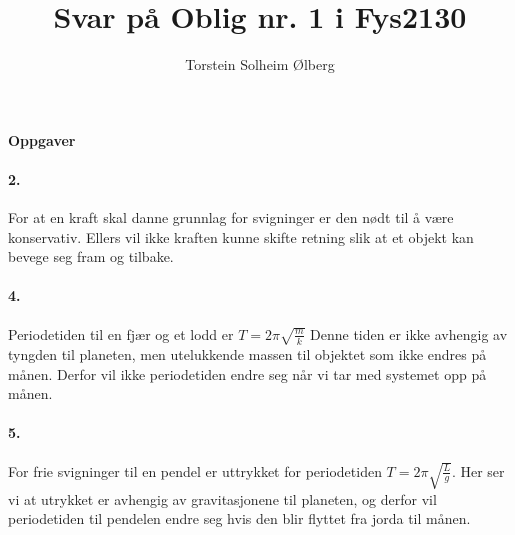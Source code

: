 \documentclass[11pt, A4paper,norsk]{article}
\author{Torstein Solheim Ølberg}
\title{Svar på Oblig nr. 1 i Fys2130}
\begin{document}
\maketitle
	\begin{center}
\Large \textbf{Oppgaver}
	\end{center}









		\paragraph{2.}
			\begin{flushleft}
For at en kraft skal danne grunnlag for svigninger er den nødt til å være konservativ. Ellers vil ikke kraften kunne skifte retning slik at et objekt kan bevege seg fram og tilbake.
			\end{flushleft}









		\paragraph{4.}
			\begin{flushleft}
Periodetiden til en fjær og et lodd er $T = 2 \pi \sqrt{\frac{m}{k}}$ Denne tiden er ikke avhengig av tyngden til planeten, men utelukkende massen til objektet som ikke endres på månen. Derfor vil ikke periodetiden endre seg når vi tar med systemet opp på månen.
			\end{flushleft}









		\paragraph{5.}
			\begin{flushleft}
For frie svigninger til en pendel er uttrykket for periodetiden $T = 2 \pi \sqrt{\frac{L}{g}}$. Her ser vi at utrykket er avhengig av gravitasjonene til planeten, og derfor vil periodetiden til pendelen endre seg hvis den blir flyttet fra jorda til månen.
			\end{flushleft}
			
\end{document}
